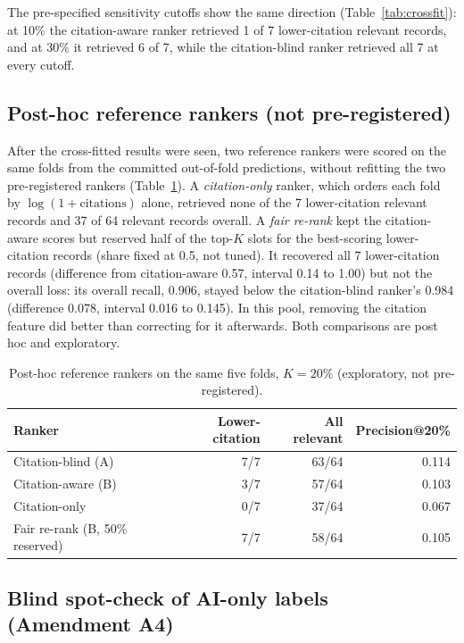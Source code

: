 \documentclass[acmsmall,screen,nonacm]{acmart}
\begin{document}
The pre-specified sensitivity cutoffs show the same direction (Table~\ref{tab:crossfit}): at 10\% the
citation-aware ranker retrieved 1 of 7 lower-citation relevant records, and at 30\% it retrieved 6 of 7,
while the citation-blind ranker retrieved all 7 at every cutoff.

\subsection{Post-hoc reference rankers (not pre-registered)}

After the cross-fitted results were seen, two reference rankers were scored on the same folds from the
committed out-of-fold predictions, without refitting the two pre-registered rankers
(Table~\ref{tab:posthoc}). A \emph{citation-only} ranker, which orders each fold by
$\log(1+\text{citations})$ alone, retrieved none of the 7 lower-citation relevant records and 37 of 64
relevant records overall. A \emph{fair re-rank} kept the citation-aware scores but reserved half of the
top-$K$ slots for the best-scoring lower-citation records (share fixed at 0.5, not tuned). It recovered all 7
lower-citation records (difference from citation-aware 0.57, interval 0.14 to 1.00) but not the overall
loss: its overall recall, 0.906, stayed below the citation-blind ranker's 0.984 (difference 0.078, interval
0.016 to 0.145). In this pool, removing the citation feature did better than correcting for it afterwards.
Both comparisons are post hoc and exploratory.

\begin{table}[t]
\caption{Post-hoc reference rankers on the same five folds, $K = 20\%$ (exploratory, not pre-registered).}
\label{tab:posthoc}
\small
\begin{tabular}{lrrr}
\toprule
Ranker & Lower-citation & All relevant & Precision@20\% \\
\midrule
Citation-blind (A) & 7/7 & 63/64 & 0.114 \\
Citation-aware (B) & 3/7 & 57/64 & 0.103 \\
Citation-only & 0/7 & 37/64 & 0.067 \\
Fair re-rank (B, 50\% reserved) & 7/7 & 58/64 & 0.105 \\
\bottomrule
\end{tabular}
\end{table}

\subsection{Blind spot-check of AI-only labels (Amendment A4)}
\label{sec:spotcheck}
\end{document}
